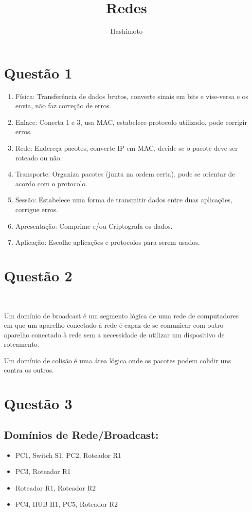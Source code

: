 \documentclass{article}
\begin{document}
\title{Redes}
\author{Hashimoto}
\date{}
\maketitle

\section*{Questão 1}

\begin{enumerate}
    \item Física:
        Transferência de dados brutos, converte sinais em bits e
        vise-versa e os envia, não faz correção de erros.
    \item Enlace:
        Conecta 1 e 3, usa MAC, estabelece protocolo utilizado,
        pode corrigir erros.
    \item Rede:
        Endereça pacotes, converte IP em MAC, decide se o pacote
        deve ser roteado ou não.
    \item Transporte:
        Organiza pacotes (junta na ordem certa), pode se orientar
        de acordo com o protocolo.
    \item Sessão:
        Estabelece uma forma de transmitir dados entre duas
        aplicações, corrigue erros.
    \item Apresentação:
        Comprime e/ou Criptografa os dados.
    \item Aplicação:
        Escolhe aplicações e protocolos para serem usados.
\end{enumerate}

\section*{Questão 2}\

Um domínio de broadcast é um segmento lógica de uma rede de computadores em
que um aparelho conectado à rede é capaz de se comunicar com outro aparelho
conectado à rede sem a necessidade de utilizar um dispositivo de roteamento.

Um domínio de colisão é uma área lógica onde os pacotes podem colidir uns
contra os outros.

\newpage
\section*{Questão 3}

\subsection*{Domínios de Rede/Broadcast:}
\begin{itemize}
    \item PC1, Switch S1, PC2, Roteador R1
    \item PC3, Roteador R1
    \item Roteador R1, Roteador R2
    \item PC4, HUB H1, PC5, Roteador R2
\end{itemize}
\end{document}
